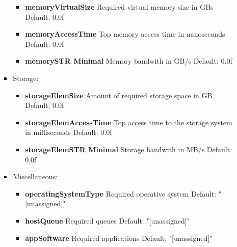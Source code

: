 \begin{itemize}
\begin{itemize}
\begin{itemize}
\begin{itemize}
			  \item \textbf{memoryVirtualSize} Required virtual memory size in GBs \newline
							   Default: 0.0f
			  \item \textbf{memoryAccessTime} Top memory access time in nanoseconds \newline
							  Default: 0.0f
			  \item \textbf{memorySTR Minimal} Memory bandwith in GB/s \newline
							   Default: 0.0f
                       \end{itemize}
                \item Storage:
                       \begin{itemize}
			  \item \textbf{storageElemSize} Amount of required storage space in GB \newline
							 Default: 0.0f
			  \item \textbf{storageElemAccessTime} Top access time to the storage system in milliseconds \newline
							       Default: 0.0f
			  \item \textbf{storageElemSTR Minimal} Storage bandwith in MB/s \newline
								Default: 0.0f
                       \end{itemize}
                \item Miscellaneous:
		       \begin{itemize}
			  \item \textbf{operatingSystemType} Required operative system \newline
							     Default: "[unassigned]"
			  \item \textbf{hostQueue} Required queues \newline
						   Default: "[unassigned]"
			  \item \textbf{appSoftware} Required applications \newline
						     Default: "[unassigned]"
                       \end{itemize}
               \end{itemize}
       \end{itemize}


\end{itemize}
